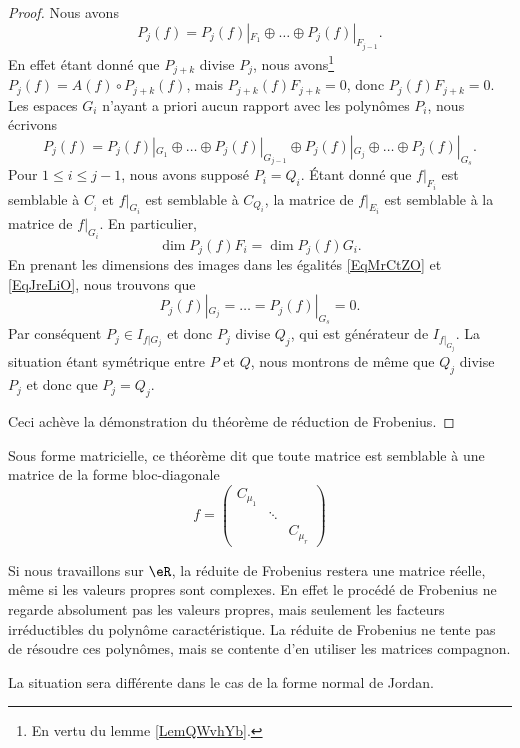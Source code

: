\begin{proof}
    Nous avons 
    \begin{equation}    \label{EqMrCtZO}
        P_j(f)=P_j(f)|_{F_1}\oplus\ldots\oplus P_j(f)|_{F_{j-1}}.
    \end{equation}
    En effet étant donné que \( P_{j+k}\) divise \( P_j\), nous avons\footnote{En vertu du lemme \ref{LemQWvhYb}.} \( P_{j}(f)=A(f)\circ P_{j+k}(f)\), mais \( P_{j+k}(f)F_{j+k}=0\), donc \( P_j(f)F_{j+k}=0\). Les espaces \( G_i\) n'ayant a priori aucun rapport avec les polynômes \( P_i\), nous écrivons
    \begin{equation}    \label{EqJreLiO}
        P_j(f)=P_j(f)|_{G_1}\oplus\ldots\oplus P_j(f)|_{G_{j-1}}\oplus P_j(f)|_{G_j}\oplus\ldots\oplus P_j(f)|_{G_s}.
    \end{equation}
    Pour \( 1\leq i\leq j-1\), nous avons supposé \( P_i=Q_i\). Étant donné que \( f|_{F_i}\) est semblable à \( C_{_i}\) et \( f|_{G_i}\) est semblable à \( C_{Q_i}\), la matrice de \( f|_{E_i}\) est semblable à la matrice de \( f|_{G_i}\). En particulier,
    \begin{equation}
        \dim P_j(f)F_i=\dim P_j(f)G_i.
    \end{equation}
    En prenant les dimensions des images dans les égalités \eqref{EqMrCtZO} et \eqref{EqJreLiO}, nous trouvons que
    \begin{equation}
        P_j(f)|_{G_j}=\ldots=P_j(f)|_{G_s}=0.
    \end{equation}
    Par conséquent \( P_j\in I_{f|G_j}\) et donc \( P_j\) divise \( Q_j\), qui est générateur de \( I_{f|_{G_j}}\). La situation étant symétrique entre \( P\) et \( Q\), nous montrons de même que \( Q_j\) divise \( P_j\) et donc que \( P_j=Q_j\).

    Ceci achève la démonstration du théorème de réduction de Frobenius.

\end{proof}


Sous forme matricielle, ce théorème dit que toute matrice est semblable à une matrice de la forme bloc-diagonale
\begin{equation}
    f=\begin{pmatrix}
        C_{\mu_1}    &       &       \\
            &   \ddots    &       \\
            &       &   C_{\mu_r}
    \end{pmatrix}
\end{equation}

\begin{remark}
    Si nous travaillons sur \( \eR\), la réduite de Frobenius restera une matrice réelle, même si les valeurs propres sont complexes. En effet le procédé de Frobenius ne regarde absolument pas les valeurs propres, mais seulement les facteurs irréductibles du polynôme caractéristique. La réduite de Frobenius ne tente pas de résoudre ces polynômes, mais se contente d'en utiliser les matrices compagnon.

    La situation sera différente dans le cas de la forme normal de Jordan.
\end{remark}

